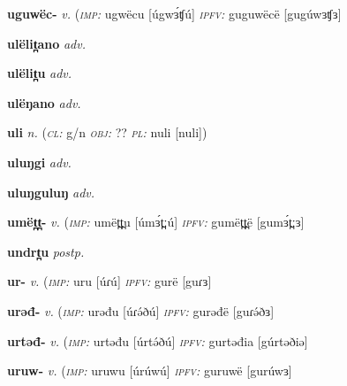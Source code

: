 \newentry
\headword\textbf{uguwëc-}  
\synpos\textit{v.} 
\imperative(\textit {\textsc{imp:}} ugwëcu [úgwɜ́ʧú] %
\imperfective\textit{\textsc{ipfv:}} guguwëcë [gugúwɜʧɜ]

\newentry
\headword\textbf{ulëlit̪ano}  
\synpos\textit{adv.} 

\newentry
\headword\textbf{ulëlit̪u}  
\synpos\textit{adv.} 

\newentry
\headword\textbf{ulëŋano}  
\ipa{[úlɜ́ŋánó]}%
\synpos\textit{adv.} 

\newentry
\headword\textbf{uli}  
\ipa{[ulí]}
\synpos\textit{n.} 
\class(\textit{\textsc{cl:}} {g/n}
\object\textit{\textsc{obj:}} ??
\plural\textit{\textsc{pl:}} nuli [nuli]) 

\newentry
\headword\textbf{uluŋgi}  
\ipa{[uluŋgi]}%
\synpos\textit{adv.} 

\newentry
\headword\textbf{uluŋguluŋ}  
\ipa{[uluŋguluŋ]}%
\synpos\textit{adv.} 

\newentry
\headword\textbf{umët̪t̪-}  
\ipa{[umɜ́t̪ː-]}
\synpos\textit{v.} 
\imperative(\textit {\textsc{imp:}} umët̪t̪u [úmɜ́t̪ːú]
\imperfective\textit{\textsc{ipfv:}} gumët̪t̪ë [gumɜ́t̪ːɜ]

\newentry
\headword\textbf{undrt̪u}  
\ipa{[undrt̪u]}
\synpos\textit{postp.} 

\newentry
\headword\textbf{ur-}  
\ipa{[uɾ-]}
\synpos\textit{v.} 
\imperative(\textit {\textsc{imp:}} uru [úɾú]
\imperfective\textit{\textsc{ipfv:}} gurë [guɾɜ]

\newentry
\headword\textbf{urəđ-}  
\ipa{[uɾə́ð-]}
\synpos\textit{v.} 
\imperative(\textit {\textsc{imp:}} urəđu [úɾə́ðú]
\imperfective\textit{\textsc{ipfv:}} gurəđë [guɾə́ðɜ]

\newentry
\headword\textbf{urtəđ-}  
\ipa{[úrtəð-]}
\synpos\textit{v.} 
\imperative(\textit {\textsc{imp:}} urtəđu [úrtə́ðú]
\imperfective\textit{\textsc{ipfv:}} gurtəđia [gúrtəðiə]

\newentry
\headword\textbf{uruw-}  
\ipa{[urúw-]}
\synpos\textit{v.} 
\imperative(\textit {\textsc{imp:}} uruwu [úrúwú]
\imperfective\textit{\textsc{ipfv:}} guruwë [gurúwɜ]

